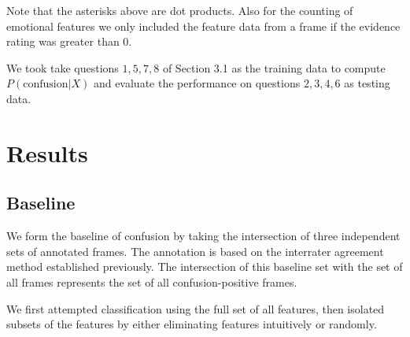 \documentclass[12pt,letterpaper]{article}
\begin{document}
Note that the asterisks above are dot products.  Also for the counting of emotional features we only included the feature data from a frame if the evidence rating was greater than 0.

We took take questions $1,5,7,8$ of Section 3.1 as the training data to compute $P(\text{confusion}|X)$ and evaluate the performance on questions $2,3,4,6$ as testing data. 


\section{Results}
\subsection{Baseline}
We form the baseline of confusion by taking the intersection of three independent sets of annotated frames. The annotation is based on the interrater agreement method established previously.  The intersection of this baseline set with the set of all frames represents the set of all confusion-positive frames.

We first attempted classification using the full set of all features, then isolated subsets of the features by either eliminating features intuitively or randomly.

\end{document}
